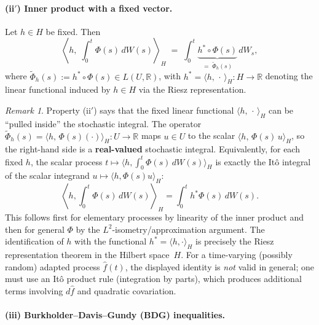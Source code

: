 \documentclass[11pt]{article}
\theoremstyle{definition}
\theoremstyle{remark}
\newtheorem{remark}{Remark}
\begin{document}
\paragraph{(ii$'$) Inner product with a fixed vector.}

Let $h \in H$ be fixed. Then
\[
    \left\langle
        h,\;
        \int_0^t \Phi(s)\,dW(s)
    \right\rangle_{\!H}
    \;=\;
    \int_0^t \underbrace{h^*\!\circ\Phi(s)}_{=\;\widetilde{\Phi}_{h}(s)}\,dW_s,
\]
where
$\widetilde{\Phi}_{h}(s) := h^*\!\circ\Phi(s) \in L(U, \mathbb{R})$,
with $h^* = \langle h,\,\cdot\,\rangle_H \colon H \to \mathbb{R}$
denoting the linear functional induced by $h \in H$ via the Riesz representation.

\begin{remark}
Property (ii$'$) says that the fixed linear functional $\langle h,\,\cdot\,\rangle_H$ can be ``pulled inside'' the stochastic integral.
The operator $\widetilde{\Phi}_{h}(s) = \langle h,\,\Phi(s)(\cdot)\rangle_H : U \to \mathbb{R}$ maps $u \in U$ to the scalar $\langle h,\,\Phi(s)\,u\rangle_H$, so the right-hand side is a \textbf{real-valued} stochastic integral.
Equivalently, for each fixed $h$, the scalar process
$t \mapsto \langle h, \int_0^t \Phi(s)\,dW(s) \rangle_H$
is exactly the It\^o integral of the scalar integrand $u \mapsto \langle h, \Phi(s)u\rangle_H$:
\[
    \left\langle h, \int_0^t \Phi(s)\,dW(s) \right\rangle_H
    =
    \int_0^t h^*\Phi(s)\,dW(s).
\]
This follows first for elementary processes by linearity of the inner product and then for general $\Phi$ by the $L^2$-isometry/approximation argument.
The identification of $h$ with the functional $h^*=\langle h,\cdot\rangle_H$ is precisely the Riesz representation theorem in the Hilbert space~$H$.
For a time-varying (possibly random) adapted process $\hat{f}(t)$, the displayed identity is \emph{not} valid in general; one must use an It\^o product rule (integration by parts), which produces additional terms involving $d\hat{f}$ and quadratic covariation.
\end{remark}

\paragraph{(iii) Burkholder--Davis--Gundy (BDG) inequalities.}
\end{document}
